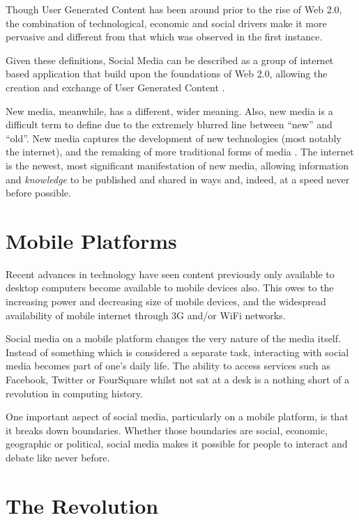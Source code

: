 \documentclass[a4paper,11pt]{article}
\begin{document}
    Though User Generated Content has been around prior to the rise of Web 2.0,
    the combination of technological, economic and social drivers make it more
    pervasive and different from that which was observed in the first instance.

    Given these definitions, Social Media can be described as a group of
    internet based application that build upon the foundations of Web 2.0,
    allowing the creation and exchange of User Generated Content
    \cite{kaplan2010}.

    New media, meanwhile, has a different, wider meaning. Also, new media is
    a difficult term to define due to the extremely blurred line between
    ``new'' and ``old''. New media captures the development of new technologies
    (most notably the internet), and the remaking of more traditional forms of
    media \cite{flew2008}. The internet is the newest, most significant
    manifestation of new media, allowing information and \emph{knowledge} to be
    published and shared in ways and, indeed, at a speed never before
    possible.

    \section{Mobile Platforms}

    Recent advances in technology have seen content previously only available
    to desktop computers become available to mobile devices also. This owes to
    the increasing power and decreasing size of mobile devices, and the
    widespread availability of mobile internet through 3G and/or WiFi networks.

    Social media on a mobile platform changes the very nature of the media
    itself. Instead of something which is considered a separate task,
    interacting with social media becomes part of one's daily life. The ability
    to access services such as Facebook, Twitter or FourSquare whilst not sat
    at a desk is a nothing short of a revolution in computing history.

    One important aspect of social media, particularly on a mobile platform, is
    that it breaks down boundaries. Whether those boundaries are social,
    economic, geographic or political, social media makes it possible for
    people to interact and debate like never before.

    \section{The Revolution}
\end{document}
